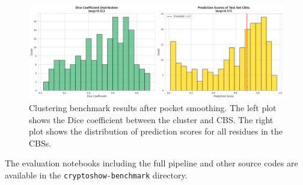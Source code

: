 \begin{figure}[htbp]
    \centering
    \includegraphics[width=\textwidth]{img/smoothened-2.png}
    \caption{Clustering benchmark results after pocket smoothing. The left plot shows the Dice coefficient between the cluster and CBS. The right plot shows the distribution of prediction scores for all residues in the CBSs.}
    \label{fig:clustering-benchmark-smoothened-dice}
\end{figure}

The evaluation notebooks including the full pipeline and other source codes are available in the \lstinline!cryptoshow-benchmark! directory.

